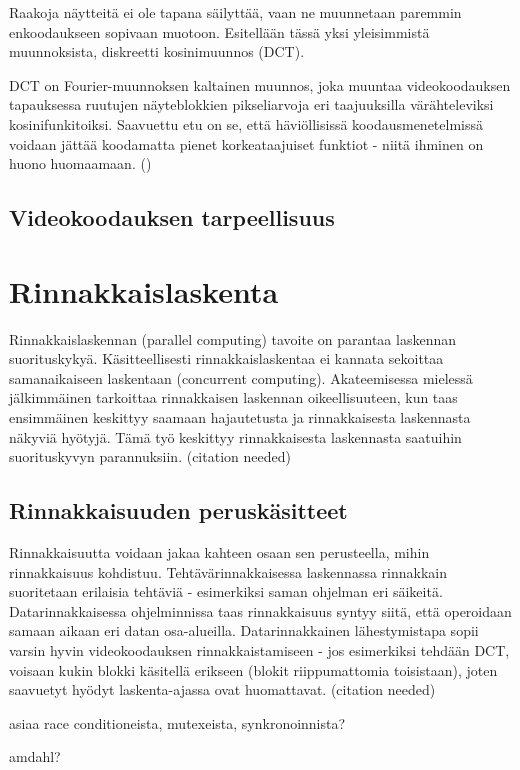 Raakoja näytteitä ei ole tapana säilyttää, vaan ne muunnetaan paremmin
enkoodaukseen sopivaan muotoon. Esitellään tässä yksi yleisimmistä
muunnoksista, diskreetti kosinimuunnos (DCT).

DCT on Fourier-muunnoksen kaltainen muunnos, joka muuntaa videokoodauksen
tapauksessa ruutujen näyteblokkien pikseliarvoja eri taajuuksilla värähteleviksi
kosinifunkitoiksi. Saavuettu etu on se, että häviöllisissä koodausmenetelmissä
voidaan jättää koodamatta pienet korkeataajuiset funktiot - niitä ihminen
on huono huomaamaan. (\cite{h264})


\newpage

\subsection{Videokoodauksen tarpeellisuus}

\newpage

\section{Rinnakkaislaskenta}

Rinnakkaislaskennan (parallel computing) tavoite on parantaa laskennan
suorituskykyä. Käsitteellisesti rinnakkaislaskentaa ei kannata sekoittaa
samanaikaiseen laskentaan (concurrent computing). Akateemisessa mielessä
jälkimmäinen tarkoittaa rinnakkaisen laskennan oikeellisuuteen, kun taas
ensimmäinen keskittyy saamaan hajautetusta ja rinnakkaisesta laskennasta
näkyviä hyötyjä. Tämä työ keskittyy rinnakkaisesta laskennasta saatuihin
suorituskyvyn parannuksiin. (citation needed)

\subsection{Rinnakkaisuuden peruskäsitteet}

Rinnakkaisuutta voidaan jakaa kahteen osaan sen perusteella, mihin rinnakkaisuus
kohdistuu. Tehtävärinnakkaisessa laskennassa rinnakkain suoritetaan erilaisia
tehtäviä - esimerkiksi saman ohjelman eri säikeitä. Datarinnakkaisessa
ohjelminnissa taas rinnakkaisuus syntyy siitä, että operoidaan samaan aikaan
eri datan osa-alueilla. Datarinnakkainen lähestymistapa sopii varsin hyvin
videokoodauksen rinnakkaistamiseen - jos esimerkiksi tehdään DCT, voisaan
kukin blokki käsitellä erikseen (blokit riippumattomia toisistaan), joten
saavuetyt hyödyt laskenta-ajassa ovat huomattavat. (citation needed)

\begin{compactitem}
	\item asiaa race conditioneista, mutexeista, synkronoinnista?
	\item amdahl?
\end{compactitem}

